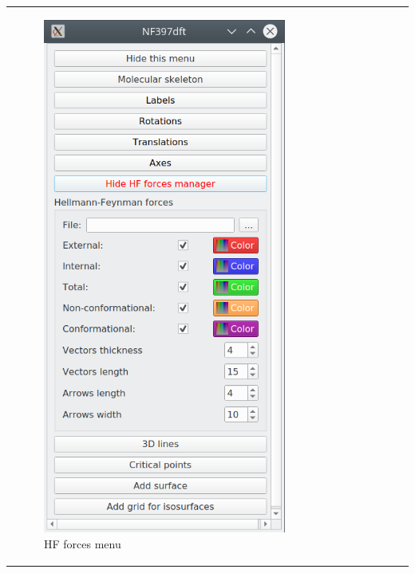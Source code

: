 \documentclass[10pt]{article}
\begin{document}
\begin{tabular}{lcr}
\begin{minipage}{.3\linewidth}
\begin{figure}[H]
\begin{center}
            \includegraphics[width=0.6\linewidth]{damqt320_HFforces_menu.png}
        \end{center}
        \vspace*{1mm}
        \caption{HF forces menu \label{fig:4_13_6_1}}
    \end{figure}
\end{minipage}
&
\begin{minipage}{.3\linewidth}
    \begin{figure}[H]
        \begin{center}

\end{center}
\end{figure}
\end{minipage}
\end{tabular}
\end{document}
